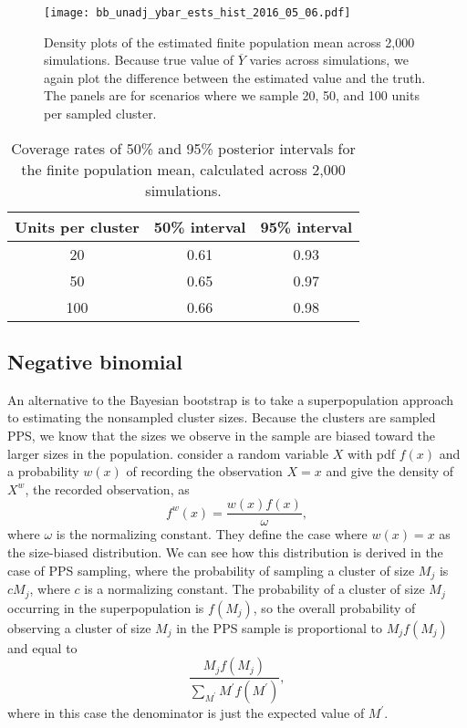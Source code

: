 \documentclass[12pt,a4paper]{article}
\begin{document}

\begin{figure}
	\centering
	\texttt{[image: bb\_unadj\_ybar\_ests\_hist\_2016\_05\_06.pdf]}
	\caption{Density plots of the estimated finite population mean across 2,000 simulations. Because true value of $\overline{Y}$ varies across simulations, we again plot the difference between the estimated value and the truth. The panels are for scenarios where we sample 20, 50, and 100 units per sampled cluster.}
	\label{fig:bb_ybar_hist}
\end{figure}

\begin{table}[h!]\label{tab:bbcovg}
	\centering
	\begin{tabular}{c|c|c}
		Units per cluster & 50\% interval & 95\% interval \\
		\hline
		20 & 0.61 & 0.93 \\
		50 & 0.65 & 0.97 \\
		100 & 0.66 & 0.98
	\end{tabular}
	\caption{Coverage rates of 50\% and 95\% posterior intervals for the finite population mean, calculated across 2,000 simulations.}
\end{table}


\subsection*{Negative binomial}
An alternative to the Bayesian bootstrap is to take a superpopulation approach to estimating the nonsampled cluster sizes. Because the clusters are sampled PPS, we know that the sizes we observe in the sample are biased toward the larger sizes in the population. \cite{pr1978} consider a random variable $X$ with pdf $f(x)$ and a probability $w(x)$ of recording the observation $X=x$ and give the density of $X^w$, the recorded observation, as
\[
	f^w(x) = \frac{w(x)f(x)}{\omega},
\]
where $\omega$ is the normalizing constant. They define the case where $w(x)=x$ as the size-biased distribution. We can see how this distribution is derived in the case of PPS sampling, where the probability of sampling a cluster of size $M_j$ is $cM_j$, where $c$ is a normalizing constant. The probability of a cluster of size $M_j$ occurring in the superpopulation is $f(M_j)$, so the overall probability of observing a cluster of size $M_j$ in the PPS sample is proportional to $M_j f(M_j)$ and equal to
\[
	\frac{M_j f(M_j)}{\sum_{M^{\prime}} M^{\prime} f(M^{\prime})},
\]
where in this case the denominator is just the expected value of $M^{\prime}$.
\end{document}
